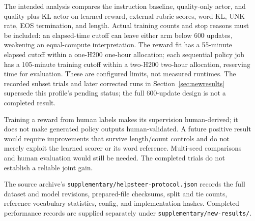 The intended analysis compares the instruction baseline, quality-only
actor, and quality-plus-KL actor on learned reward, external rubric
scores, word KL, UNK rate, EOS termination, and length. Actual training
counts and stop reasons must be included: an elapsed-time cutoff can
leave either arm below 600 updates, weakening an equal-compute
interpretation. The reward fit has a 55-minute elapsed cutoff within a
one-H200 one-hour allocation; each sequential policy job has a
105-minute training cutoff within a two-H200 two-hour allocation,
reserving time for evaluation. These are configured limits, not measured
runtimes. The recorded subset trials and later corrected runs in
Section~\ref{sec:newresults} supersede this profile's pending status;
the full 600-update design is not a completed result.

Training a reward from human labels makes its supervision human-derived;
it does not make generated policy outputs human-validated. A future
positive result would require improvements that survive length/count
controls and do not merely exploit the learned scorer or its word
reference. Multi-seed comparisons and human evaluation would still be
needed. The completed trials do not establish a reliable joint gain.

The source archive's \texttt{supplementary/helpsteer-protocol.json} records
the full dataset and model revisions, prepared-file checksums, split and
tie counts, reference-vocabulary statistics, config, and implementation
hashes. Completed performance records are supplied separately under
\texttt{supplementary/new-results/}.
